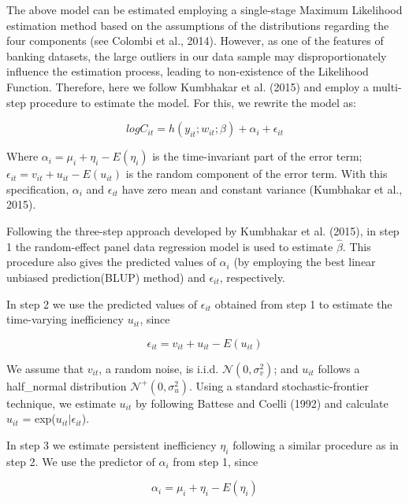 \documentclass[
  12pt,
  a4paper,
]{scrreprt}
\begin{document}
The above model can be estimated employing a single-stage Maximum
Likelihood estimation method based on the assumptions of the
distributions regarding the four components (see Colombi et al., 2014).
However, as one of the features of banking datasets, the large outliers
in our data sample may disproportionately influence the estimation
process, leading to non-existence of the Likelihood Function. Therefore,
here we follow Kumbhakar et al. (2015) and employ a multi-step procedure
to estimate the model. For this, we rewrite the model as:

\begin{equation}
logC_{it} = h(y_{it}; w_{it}; \beta) + \alpha_{i} + \epsilon_{it}
\end{equation}

Where \(\alpha_{i}=\mu_{i}+\eta_{i}-E(\eta_{i})\) is the time-invariant
part of the error term; \(\epsilon_{it}=v_{it}+u_{it}-E(u_{it})\) is the
random component of the error term. With this specification,
\(\alpha_{i}\) and \(\epsilon_{it}\) have zero mean and constant
variance (Kumbhakar et al., 2015).

Following the three-step approach developed by Kumbhakar et al. (2015),
in step 1 the random-effect panel data regression model is used to
estimate \(\hat{\beta}\). This procedure also gives the predicted values
of \(\alpha_{i}\) (by employing the best linear unbiased
prediction(BLUP) method) and \(\epsilon_{it}\), respectively.

In step 2 we use the predicted values of \(\epsilon_{it}\) obtained from
step 1 to estimate the time-varying inefficiency \(u_{it}\), since

\begin{equation}
\epsilon_{it}=v_{it}+u_{it}-E(u_{it})
\end{equation}

We assume that \(v_{it}\), a random noise, is i.i.d.
\(\mathcal{N}(0,\sigma_{v}^{2})\); and \(u_{it}\) follows a half\_normal
distribution \(\mathcal{N}^{+}(0,\sigma_{u}^{2})\). Using a standard
stochastic-frontier technique, we estimate \(u_{it}\) by following
Battese and Coelli (1992) and calculate \(\hat u_{it}\) =
exp(\(u_{it}|\epsilon_{it}\)).

In step 3 we estimate persistent inefficiency \(\eta_{i}\) following a
similar procedure as in step 2. We use the predictor of \(\alpha_{i}\)
from step 1, since

\begin{equation}
\alpha_{i}=\mu_{i}+\eta_{i}-E(\eta_{i})
\end{equation}
\end{document}
